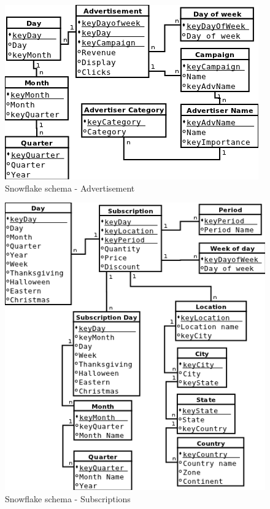 
\begin{figure}[!hbp]
    \includegraphics[scale=0.4]{schema_snowflake_advertisement}
\caption{\label{pic:sn_adv} Snowflake schema - Advertisement}
\end{figure}

\begin{figure}[!hbp]
    \includegraphics[scale=0.4]{schema_snowflake_subscriptions}
\caption{\label{pic:sn_sub}  Snowflake schema - Subscriptions}
\end{figure}

